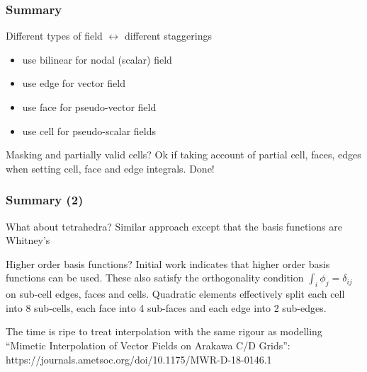 \documentclass[aspectratio=169]{beamer}
\begin{document}
\begin{frame}[t]
  \frametitle{Summary}
    \begin{block}{Different types of field $\leftrightarrow$ different staggerings}
      \begin{itemize}%
	  \item use bilinear for nodal (scalar) field
	  \item use {\color{red} edge} for vector field
	  \item use {\color{red} face} for pseudo-vector field
	  \item use cell for pseudo-scalar fields
    \end{itemize}
    \end{block}
    \begin{block}{Masking and partially valid cells?}
	 Ok if taking account of partial cell, faces, edges when setting cell, face and edge integrals. Done!
  \end{block}
\end{frame}

\begin{frame}[t]
  \frametitle{Summary (2)}
    \begin{block}{What about tetrahedra?}
      Similar approach except that the basis functions are Whitney's
    \end{block}
    \begin{block}{Higher order basis functions?}
    Initial work indicates that higher order basis functions can be used. These also satisfy the orthogonality condition $\int_i \phi_j = \delta_{ij}$
    on sub-cell edges, faces and cells. Quadratic elements effectively 
     split each cell into 8 sub-cells, each face into 4 sub-faces and each edge into 2 sub-edges. 
  \end{block}
    \begin{block}{The time is ripe to treat interpolation with the same rigour as modelling}
    	``Mimetic Interpolation of Vector Fields on Arakawa C/D Grids'': https://journals.ametsoc.org/doi/10.1175/MWR-D-18-0146.1
  \end{block}
\end{frame}
\end{document}
